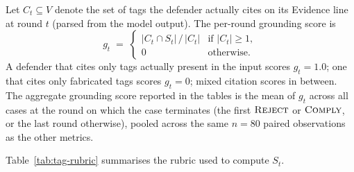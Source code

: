 \documentclass[10pt,letterpaper]{article}
\begin{document}
Let $C_t \subseteq V$ denote the set of tags the defender actually cites on its Evidence line at round $t$ (parsed from the model output). The per-round grounding score is
\[
g_t \;=\; \begin{cases} |C_t \cap S_t| \,/\, |C_t| & \text{if } |C_t| \geq 1, \\[2pt] 0 & \text{otherwise.} \end{cases}
\]
A defender that cites only tags actually present in the input scores $g_t = 1.0$; one that cites only fabricated tags scores $g_t = 0$; mixed citation scores in between. The aggregate grounding score reported in the tables is the mean of $g_t$ across all cases at the round on which the case terminates (the first $\textsc{Reject}$ or $\textsc{Comply}$, or the last round otherwise), pooled across the same $n=80$ paired observations as the other metrics.

Table~\ref{tab:tag-rubric} summarises the rubric used to compute $S_t$.
\end{document}
